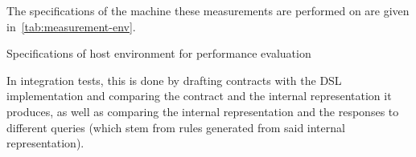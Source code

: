 The specifications of the machine these measurements are performed on are given in~\autoref{tab:measurement-env}.

\begin{table}[h]
    \caption{Specifications of host environment for performance evaluation}
    \label{tab:measurement-env}
\end{table}




In integration tests, this is done by drafting contracts with the DSL implementation and comparing the contract and the internal representation it produces, as well as comparing the internal representation and the responses to different queries (which stem from rules generated from said internal representation).
